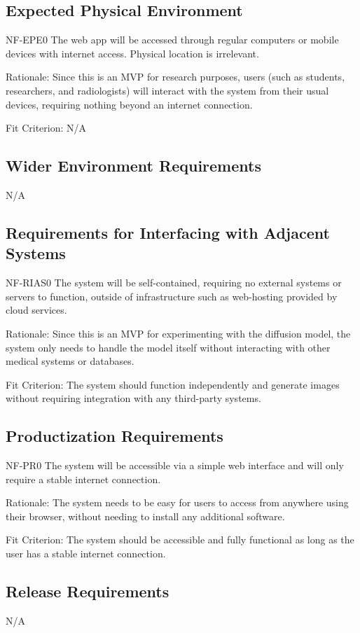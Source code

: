 \documentclass[12pt]{article}
\begin{document}
\subsection{Expected Physical Environment}
NF-EPE0 The web app will be accessed through regular computers or mobile devices with internet 
access. Physical location is irrelevant.

Rationale: Since this is an MVP for research purposes, users (such as students, researchers, and 
radiologists) will interact with the system from their usual devices, requiring nothing beyond an 
internet connection.

Fit Criterion: N/A

\subsection{Wider Environment Requirements}
N/A


\subsection{Requirements for Interfacing with Adjacent Systems}
NF-RIAS0 The system will be self-contained, requiring no external systems or servers to function, 
outside of infrastructure such as web-hosting provided by cloud services.

Rationale: Since this is an MVP for experimenting with the diffusion model, the system only needs
 to handle the model itself without interacting with other medical systems or databases.

Fit Criterion: The system should function independently and generate images without requiring 
integration with any third-party systems.

\subsection{Productization Requirements}
NF-PR0 The system will be accessible via a simple web interface and will only require a stable 
internet connection.

Rationale: The system needs to be easy for users to access from anywhere using their browser, 
without needing to install any additional software.

Fit Criterion: The system should be accessible and fully functional as long as the user has a 
stable internet connection.

\subsection{Release Requirements}
N/A
\end{document}
